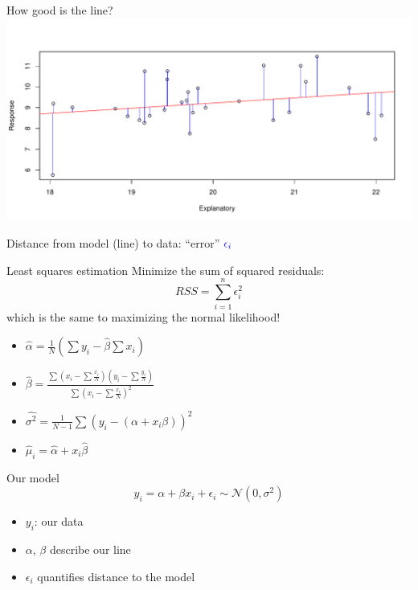 \documentclass[
  ignorenonframetext,
]{beamer}
\providecommand{\tightlist}{%
  \setlength{\itemsep}{0pt}\setlength{\parskip}{0pt}}
\begin{document}
\begin{frame}{How good is the line?}
\label{how-good-is-the-line}
\includegraphics{IntroLM_files/figure-beamer/norm-1.pdf}

Distance from model (line) to data: ``error''
\(\textcolor{blue}{\epsilon_i}\)
\end{frame}

\begin{frame}{Least squares estimation}
\label{least-squares-estimation}
Minimize the sum of squared residuals: \begin{equation}
RSS = \sum \limits^n_{i=1} \epsilon_i^2
\end{equation} which is the same to maximizing the normal likelihood!

\begin{itemize}
\tightlist
\item
  \(\hat{\alpha}= \frac{1}{N}(\sum y_i - \hat{\beta}\sum x_i)\)
\item
  \(\hat{\beta} = \frac{\sum (x_i - \sum \frac{x_i}{N})(y_i - \sum \frac{y_i}{N})}{\sum (x_i - \sum \frac{x_i}{N})^2}\)
\item
  \(\hat{\sigma^2} = \frac{1}{N-1}\sum (y_i - (\alpha+x_i\beta))^2\)
\item
  \(\hat{\mu}_i = \hat{\alpha}+x_i\hat{\beta}\)
\end{itemize}
\end{frame}

\begin{frame}{Our model}
\label{our-model}
\begin{equation}
y_i = \alpha + \beta x_i + \epsilon_i\sim \mathcal{N}(0,\sigma^2)
\end{equation}

\begin{itemize}
\tightlist
\item
  \(y_i\): our data
\item
  \(\alpha\), \(\beta\) describe our line
\item
  \(\epsilon_i\) quantifies distance to the model
\end{itemize}
\end{frame}
\end{document}
